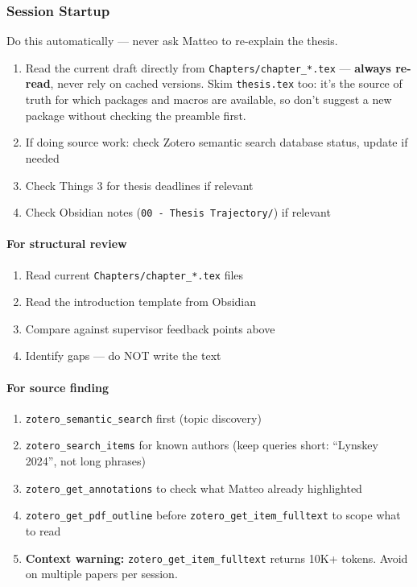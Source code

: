 \subsubsection{Session Startup}

Do this automatically --- never ask Matteo to re-explain the thesis.

\begin{enumerate}
  \item Read the current draft directly from \texttt{Chapters/chapter\_*.tex} ---
        \textbf{always re-read}, never rely on cached versions. Skim
        \texttt{thesis.tex} too: it's the source of truth for which packages and
        macros are available, so don't suggest a new package without checking the
        preamble first.
  \item If doing source work: check Zotero semantic search database status, update
        if needed
  \item Check Things 3 for thesis deadlines if relevant
  \item Check Obsidian notes (\texttt{00 - Thesis Trajectory/}) if relevant
\end{enumerate}

\paragraph{For structural review}
\begin{enumerate}
  \item Read current \texttt{Chapters/chapter\_*.tex} files
  \item Read the introduction template from Obsidian
  \item Compare against supervisor feedback points above
  \item Identify gaps --- do NOT write the text
\end{enumerate}

\paragraph{For source finding}
\begin{enumerate}
  \item \texttt{zotero\_semantic\_search} first (topic discovery)
  \item \texttt{zotero\_search\_items} for known authors (keep queries short:
        ``Lynskey 2024'', not long phrases)
  \item \texttt{zotero\_get\_annotations} to check what Matteo already highlighted
  \item \texttt{zotero\_get\_pdf\_outline} before \texttt{zotero\_get\_item\_fulltext}
        to scope what to read
  \item \textbf{Context warning:} \texttt{zotero\_get\_item\_fulltext} returns 10K+
        tokens. Avoid on multiple papers per session.
\end{enumerate}

